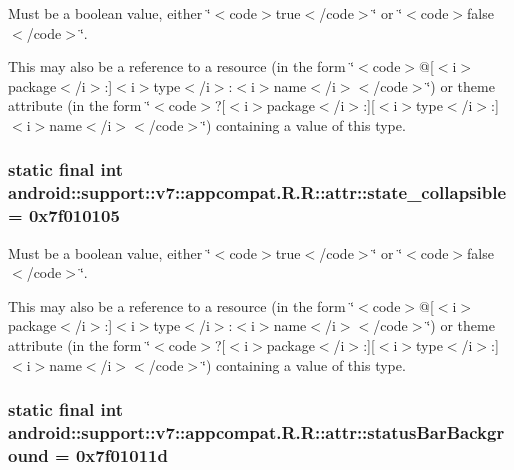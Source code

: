 Must be a boolean value, either \char`\"{}$<$code$>$true$<$/code$>$\char`\"{} or \char`\"{}$<$code$>$false$<$/code$>$\char`\"{}. 

This may also be a reference to a resource (in the form \char`\"{}$<$code$>$@\mbox{[}$<$i$>$package$<$/i$>$:\mbox{]}$<$i$>$type$<$/i$>$:$<$i$>$name$<$/i$>$$<$/code$>$\char`\"{}) or theme attribute (in the form \char`\"{}$<$code$>$?\mbox{[}$<$i$>$package$<$/i$>$:\mbox{]}\mbox{[}$<$i$>$type$<$/i$>$:\mbox{]}$<$i$>$name$<$/i$>$$<$/code$>$\char`\"{}) containing a value of this type. \hypertarget{classandroid_1_1support_1_1v7_1_1appcompat_1_1_r_1_1attr_e6f01b270019836b9e63f3e1a95c7671}{
\subsubsection[{state\_\-collapsible}]{\setlength{\rightskip}{0pt plus 5cm}static final int android::support::v7::appcompat.R.R::attr::state\_\-collapsible = 0x7f010105}}
\label{classandroid_1_1support_1_1v7_1_1appcompat_1_1_r_1_1attr_e6f01b270019836b9e63f3e1a95c7671}


Must be a boolean value, either \char`\"{}$<$code$>$true$<$/code$>$\char`\"{} or \char`\"{}$<$code$>$false$<$/code$>$\char`\"{}. 

This may also be a reference to a resource (in the form \char`\"{}$<$code$>$@\mbox{[}$<$i$>$package$<$/i$>$:\mbox{]}$<$i$>$type$<$/i$>$:$<$i$>$name$<$/i$>$$<$/code$>$\char`\"{}) or theme attribute (in the form \char`\"{}$<$code$>$?\mbox{[}$<$i$>$package$<$/i$>$:\mbox{]}\mbox{[}$<$i$>$type$<$/i$>$:\mbox{]}$<$i$>$name$<$/i$>$$<$/code$>$\char`\"{}) containing a value of this type. \hypertarget{classandroid_1_1support_1_1v7_1_1appcompat_1_1_r_1_1attr_2cf8b6fe98e955d4fecf46deaeeaf5c7}{
\subsubsection[{statusBarBackground}]{\setlength{\rightskip}{0pt plus 5cm}static final int android::support::v7::appcompat.R.R::attr::statusBarBackground = 0x7f01011d}}
\label{classandroid_1_1support_1_1v7_1_1appcompat_1_1_r_1_1attr_2cf8b6fe98e955d4fecf46deaeeaf5c7}


